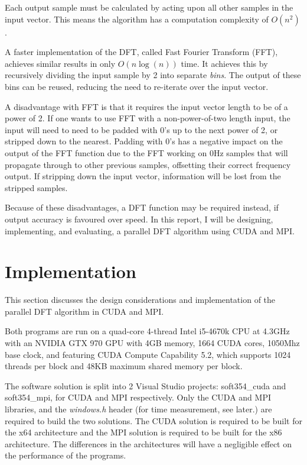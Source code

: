\documentclass[11pt,a4paper]{article}
\begin{document}
Each output sample must be calculated by acting upon all other samples in the input vector. This means the algorithm has a computation complexity of $O(n^2)$  \cite{wikipedia:dft}.

A faster implementation of the DFT, called Fast Fourier Transform (FFT), achieves similar results in only $O(n\log(n))$ time. It achieves this by recursively dividing the input sample by 2 into separate \textit{bins}. The output of these bins can be reused, reducing the need to re-iterate over the input vector.


A disadvantage with FFT is that it requires the input vector length to be of a power of 2. If one wants to use FFT with a non-power-of-two length input, the input will need to need to be padded with 0's up to the next power of 2, or stripped down to the nearest. Padding with 0's has a negative impact on the output of the FFT function due to the FFT  working on 0Hz samples that will propagate through to other previous samples, offsetting their correct frequency output. If stripping down the input vector, information will be lost from the stripped samples.

Because of these disadvantages, a DFT function may be required instead, if output accuracy is favoured over speed. In this report, I will be designing, implementing, and evaluating, a parallel DFT algorithm using CUDA and MPI.

\section{Implementation}
This section discusses the design considerations and implementation of the parallel DFT algorithm in CUDA and MPI.

Both programs are run on a quad-core 4-thread Intel i5-4670k CPU at 4.3GHz with an NVIDIA GTX 970 GPU with 4GB memory, 1664 CUDA cores, 1050Mhz base clock, and featuring CUDA Compute Capability 5.2, which supports 1024 threads per block and 48KB maximum shared memory per block.

The software solution is split into 2 Visual Studio projects: soft354\_cuda and soft354\_mpi, for CUDA and MPI respectively. Only the CUDA and MPI libraries, and the \textit{windows.h} header (for time measurement, see later.) are required to build the two solutions. 
The CUDA solution is required to be built for the x64 architecture and the MPI solution is required to be built for the x86 architecture. The differences in the architectures will have a negligible effect on the performance of the programs. 
\end{document}
